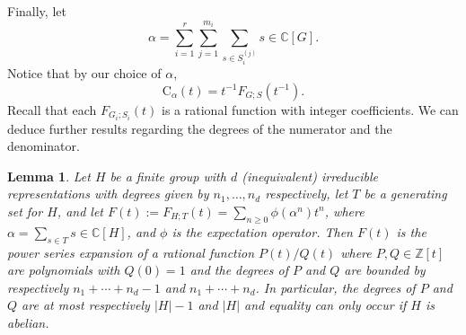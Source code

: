 \documentclass[11pt]{amsart}
\newtheorem{lemma}[theorem]{Lemma}
\theoremstyle{definition}
\newcommand{\C}{\mathbb{C}}
\newcommand{\inv}[1]{#1^{-1}}
\newcommand{\CT}{\mathrm{C}}
\newcommand{\invCT}{\mathrm{K}}
\begin{document}
Finally, let $$\alpha = \sum_{i=1}^r\sum_{j=1}^{m_i} \sum_{s\in S_i^{(j)}} s\in \mathbb{C}[G].$$
Notice that by our choice of $\alpha$, 
\begin{equation}\label{eq:11}
\CT_{\alpha}(t)=\inv{t}F_{G;S}(\inv{t}).
\end{equation}
 Recall that each 
$F_{G_i;S_i}(t)$ is a rational function with integer coefficients. We
can deduce further results regarding the degrees of the numerator and the denominator. \begin{lemma}\label{lem:bound}
Let $H$ be a finite group with $d$ (inequivalent) irreducible representations with degrees given by $n_1,\ldots ,n_d$ respectively, let $T$ be a generating set for $H$, and let $F(t):=F_{H;T}(t)=\sum_{n\ge 0} \phi(\alpha^n) t^n$, where $\alpha=\sum_{s\in T} s\in \mathbb{C}[H]$, and $\phi$ is the expectation operator.
Then $F(t)$ is the power series expansion of a rational function $P(t)/Q(t)$ where $P,Q\in \mathbb{Z}[t]$ are polynomials with $Q(0)=1$ and the degrees of $P$ and $Q$ are bounded by respectively $n_1+\cdots + n_d-1$ and $n_1+\cdots + n_d$.
In particular, the degrees of $P$ and $Q$ are at most respectively $|H|-1$ and $|H|$ and equality can only occur if $H$ is abelian.
\end{lemma}
\end{document}
